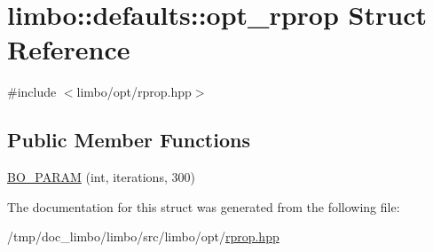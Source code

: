 \hypertarget{structlimbo_1_1defaults_1_1opt__rprop}{}\section{limbo\+:\+:defaults\+:\+:opt\+\_\+rprop Struct Reference}
\label{structlimbo_1_1defaults_1_1opt__rprop}


{\ttfamily \#include $<$limbo/opt/rprop.\+hpp$>$}

\subsection*{Public Member Functions}
\begin{DoxyCompactItemize}
\item 
\hyperlink{group__opt__defaults_gadf6a8058cda20130ad992631e561eb5a}{B\+O\+\_\+\+P\+A\+R\+AM} (int, iterations, 300)
\end{DoxyCompactItemize}


The documentation for this struct was generated from the following file\+:\begin{DoxyCompactItemize}
\item 
/tmp/doc\+\_\+limbo/limbo/src/limbo/opt/\hyperlink{rprop_8hpp}{rprop.\+hpp}\end{DoxyCompactItemize}
